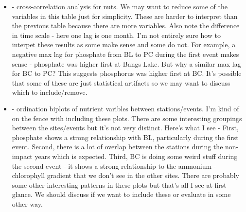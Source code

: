 \documentclass[letterpaper,12pt]{article}\usepackage[]{graphicx}\usepackage[]{color}
\begin{document}
\begin{itemize}
\item {} - cross-correlation analysis for nuts.  We may want to reduce some of the variables in this table just for simplicity.  These are harder to interpret than the previous table because there are more variables.  Also note the difference in time scale - here one lag is one month.  I'm not entirely sure how to interpet these results as some make sense and some do not.  For example, a negative max lag for phosphate from BL to PC during the first event makes sense - phosphate was higher first at Bangs Lake.  But why a similar max lag for BC to PC?  This suggests phosphorus was higher first at BC.  It's possible that some of these are just statistical artifacts so we may want to discuss which to include/remove.  
\item {} - ordination biplots of nutrient varibles between stations/events.  I'm kind of on the fence with including these plots.  There are some interesting groupings between the sites/events but it's not very distinct.  Here's what I see - First, phosphate shows a strong relationship with BL, particularly during the first event.  Second, there is a lot of overlap between the stations during the non-impact years which is expected.  Third, BC is doing some weird stuff during the second event - it shows a strong relationship to the ammonium - chlorophyll gradient that we don't see in the other sites.  There are probably some other interesting patterns in these plots but that's all I see at first glance.  We should discuss if we want to include these or evaluate in some other way.  
\end{itemize}
\end{document}
